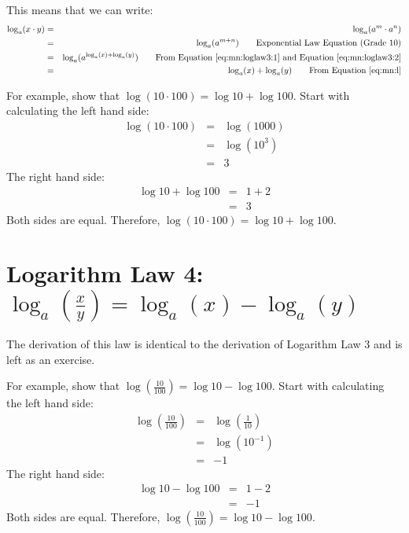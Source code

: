 This means that we can write:
\begin{eqnarray*}
\log_{a}(x \cdot y)&=&\log_{a}(a^m \cdot a^n)\\
&=&\log_{a}(a^{m+n}) \qquad \mbox{Exponential Law Equation (Grade 10)}\\
&=&\log_{a}(a^{\log_{a}(x)+\log_{a}(y)}) \qquad \mbox{From Equation~\ref{eq:mn:loglaw3:1} and Equation~\ref{eq:mn:loglaw3:2}}\\
&=&\log_{a}(x)+\log_{a}(y) \qquad \mbox{From Equation~\ref{eq:mn:l}}
\end{eqnarray*}

For example, show that $\log (10 \cdot 100) = \log 10 + \log 100$. Start with calculating the left hand side:
\begin{eqnarray*}
\log (10 \cdot 100) &=& \log (1000)\\
&=& \log (10^3)\\
&=&3
\end{eqnarray*}
The right hand side:
\begin{eqnarray*}
\log 10 + \log 100 &=& 1 + 2\\
&=&3
\end{eqnarray*}
Both sides are equal. Therefore, $\log (10 \cdot 100) = \log 10 + \log 100$.


\section{Logarithm Law 4: $\log_{a}\left(\frac{x}{y}\right) = \log_{a}(x) - \log_{a}(y)$}

The derivation of this law is identical to the derivation of Logarithm Law 3 and is left as an exercise.

For example, show that $\log (\frac{10}{100}) = \log 10 - \log 100$. Start with calculating the left hand side:
\begin{eqnarray*}
\log (\frac{10}{100}) &=& \log (\frac{1}{10})\\
&=& \log (10^{-1})\\
&=&-1
\end{eqnarray*}
The right hand side:
\begin{eqnarray*}
\log 10 - \log 100 &=& 1 -2 \\
&=&-1
\end{eqnarray*}
Both sides are equal. Therefore, $\log (\frac{10}{100}) = \log 10 - \log 100$.

